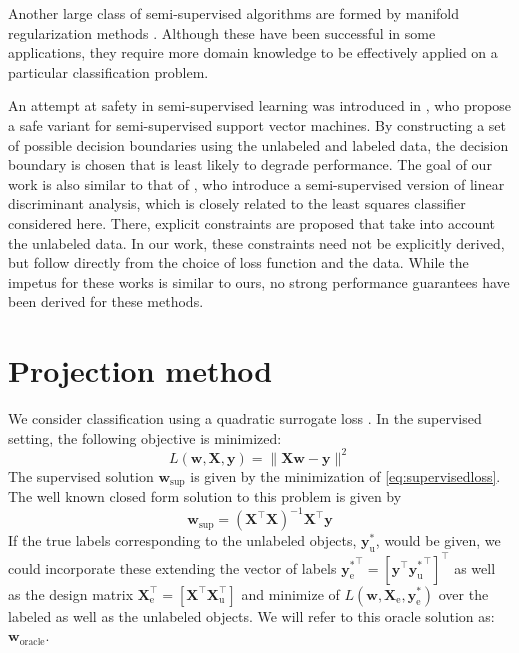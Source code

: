 \documentclass{article}
\newcommand{\Xe}{\vec{X}_\mathrm{e}  }
\renewcommand{\vec}[1]{\mathbf{#1}}
\begin{document}
Another large class of semi-supervised algorithms are formed by manifold regularization methods \cite{Niyogi2013}. Although these have been successful in some applications, they require more domain knowledge to be effectively applied on a particular classification problem.

An attempt at safety in semi-supervised learning was introduced in \cite{Li2011}, who propose a safe variant for semi-supervised support vector machines. By constructing a set of possible decision boundaries using the unlabeled and labeled data, the decision boundary is chosen that is least likely to degrade performance. The goal of our work is also similar to that of \cite{Loog2013a}, who introduce a semi-supervised version of linear discriminant analysis, which is closely related to the least squares classifier considered here. There, explicit constraints are proposed that take into account the unlabeled data. In our work, these constraints need not be explicitly derived, but follow  directly from the choice of loss function and the data. While the impetus for these works is similar to ours, no strong performance guarantees have been derived for these methods. 

\section{Projection method}
\label{Projections}
We consider classification using a quadratic surrogate loss \cite{Hastie2001}. In the supervised setting, the following objective is minimized:
\begin{equation}
\label{eq:supervisedloss}
L(\vec{w},\vec{X},\vec{y}) = \lVert \vec{X} \vec{w} - \vec{y} \rVert^2
\end{equation}
The supervised solution $\vec{w}_{\text{sup}}$ is given by the minimization of \eqref{eq:supervisedloss}. The well known closed form solution to this problem is given by
\begin{equation}
\label{eq:supervisedsolution}
\vec{w}_{\text{sup}} = (\vec{X}^\top \vec{X})^{-1} \vec{X}^\top \vec{y}
\end{equation}
If the true labels corresponding to the unlabeled objects, $\vec{y}_\text{u}^{\ast}$, would be given, we could incorporate these extending the vector of labels ${\vec{y}_\text{e}^\ast}^\top = \left[ \vec{y}^\top {\vec{y}_\text{u}^\ast}^\top \right]^\top$ as well as the design matrix $\vec{X}_\text{e}^\top = \left[ \vec{X}^\top \vec{X}_\text{u}^\top \right]$ and minimize of $L(\vec{w},\Xe, \vec{y}_\text{e}^\ast)$ over the labeled as well as the unlabeled objects. We will refer to this oracle solution as: $\vec{w}_\text{oracle}$. 
\end{document}
